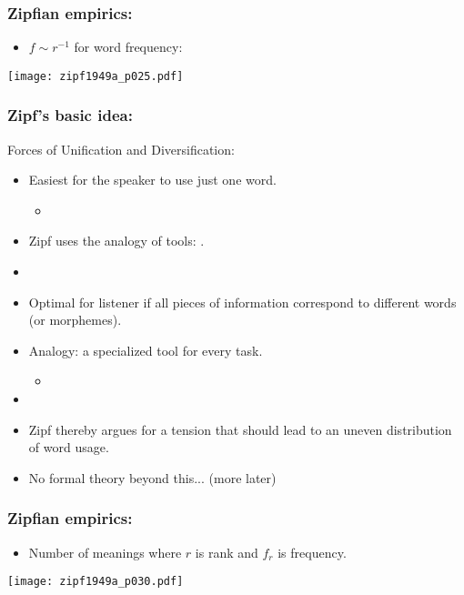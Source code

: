 \begin{frame}
  \frametitle{Zipfian empirics:}

  \begin{itemize}
  \item $f \sim r^{-1}$ for word frequency:
  \end{itemize}

    \centering
    \texttt{[image: zipf1949a\_p025.pdf]}

\end{frame}

\begin{frame}
  \frametitle{Zipf's basic idea:}

  \begin{block}{Forces of Unification and Diversification:}
  \begin{itemize}
  \item<1-> Easiest for the speaker to use just one word.
    \begin{itemize}
    \item<5-> 
    \end{itemize}
  \item<2-> Zipf uses the analogy of tools: .
  \item[]
  \item<3-> Optimal for listener if all pieces of information
    correspond to different words (or morphemes).
  \item<4-> Analogy: a specialized tool for every task.
    \begin{itemize}
    \item<6-> 
    \end{itemize}
  \item[]
  \item<7-> Zipf thereby argues for a tension that should lead
    to an uneven distribution of word usage.
  \item<8-> No formal theory beyond this...
    (more later\cite{ferrericancho2003a})
  \end{itemize}
  \end{block}

\end{frame}


\begin{frame}
  \frametitle{Zipfian empirics:}
  
  \begin{itemize}
  \item Number of meanings  where
    $r$ is rank and $f_r$ is frequency.
  \end{itemize}

  \centering
  \texttt{[image: zipf1949a\_p030.pdf]}

\end{frame}

